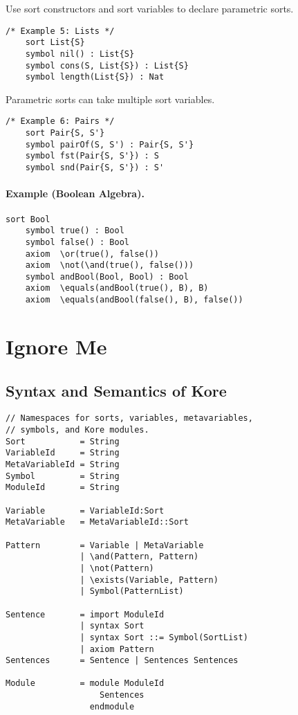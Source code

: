 \documentclass[UTF8,11pt]{article}
\theoremstyle{plain}
\theoremstyle{definition}
\theoremstyle{remark}
\begin{document}
Use sort constructors and sort variables to declare parametric sorts.
\begin{Verbatim}[fontsize=\small]
    /* Example 5: Lists */
    sort List{S}
    symbol nil() : List{S}
    symbol cons(S, List{S}) : List{S}
    symbol length(List{S}) : Nat
\end{Verbatim}

Parametric sorts can take multiple sort variables.
\begin{Verbatim}[fontsize=\small]
    /* Example 6: Pairs */
    sort Pair{S, S'}
    symbol pairOf(S, S') : Pair{S, S'}
    symbol fst(Pair{S, S'}) : S
    symbol snd(Pair{S, S'}) : S'  
\end{Verbatim}

\paragraph{Example (Boolean Algebra).}
\begin{Verbatim}[fontsize=\small]
    sort Bool
    symbol true() : Bool
    symbol false() : Bool
    axiom  \or(true(), false())
    axiom  \not(\and(true(), false()))
    symbol andBool(Bool, Bool) : Bool
    axiom  \equals(andBool(true(), B), B)
    axiom  \equals(andBool(false(), B), false())
\end{Verbatim}



\section{Ignore Me}

\subsection{Syntax and Semantics of Kore}
\label{sec:syntax-of-kore}

\begin{Verbatim}[fontsize=\small]
// Namespaces for sorts, variables, metavariables,
// symbols, and Kore modules.
Sort           = String
VariableId     = String
MetaVariableId = String
Symbol         = String
ModuleId       = String

Variable       = VariableId:Sort
MetaVariable   = MetaVariableId::Sort

Pattern        = Variable | MetaVariable
               | \and(Pattern, Pattern)
               | \not(Pattern)
               | \exists(Variable, Pattern)
               | Symbol(PatternList)

Sentence       = import ModuleId
               | syntax Sort
               | syntax Sort ::= Symbol(SortList)
               | axiom Pattern
Sentences      = Sentence | Sentences Sentences

Module         = module ModuleId
                   Sentences
                 endmodule
\end{Verbatim}
\end{document}
